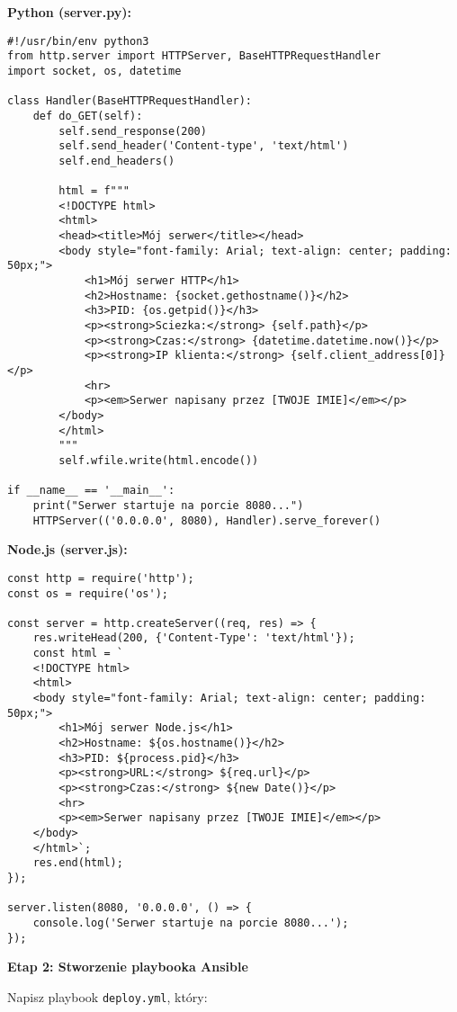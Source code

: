 \documentclass{article}
\begin{document}
\textbf{Python (server.py):}
\begin{lstlisting}
#!/usr/bin/env python3
from http.server import HTTPServer, BaseHTTPRequestHandler
import socket, os, datetime

class Handler(BaseHTTPRequestHandler):
    def do_GET(self):
        self.send_response(200)
        self.send_header('Content-type', 'text/html')
        self.end_headers()
        
        html = f"""
        <!DOCTYPE html>
        <html>
        <head><title>Mój serwer</title></head>
        <body style="font-family: Arial; text-align: center; padding: 50px;">
            <h1>Mój serwer HTTP</h1>
            <h2>Hostname: {socket.gethostname()}</h2>
            <h3>PID: {os.getpid()}</h3>
            <p><strong>Sciezka:</strong> {self.path}</p>
            <p><strong>Czas:</strong> {datetime.datetime.now()}</p>
            <p><strong>IP klienta:</strong> {self.client_address[0]}</p>
            <hr>
            <p><em>Serwer napisany przez [TWOJE IMIE]</em></p>
        </body>
        </html>
        """
        self.wfile.write(html.encode())

if __name__ == '__main__':
    print("Serwer startuje na porcie 8080...")
    HTTPServer(('0.0.0.0', 8080), Handler).serve_forever()
\end{lstlisting}

\textbf{Node.js (server.js):}
\begin{lstlisting}
const http = require('http');
const os = require('os');

const server = http.createServer((req, res) => {
    res.writeHead(200, {'Content-Type': 'text/html'});
    const html = `
    <!DOCTYPE html>
    <html>
    <body style="font-family: Arial; text-align: center; padding: 50px;">
        <h1>Mój serwer Node.js</h1>
        <h2>Hostname: ${os.hostname()}</h2>
        <h3>PID: ${process.pid}</h3>
        <p><strong>URL:</strong> ${req.url}</p>
        <p><strong>Czas:</strong> ${new Date()}</p>
        <hr>
        <p><em>Serwer napisany przez [TWOJE IMIE]</em></p>
    </body>
    </html>`;
    res.end(html);
});

server.listen(8080, '0.0.0.0', () => {
    console.log('Serwer startuje na porcie 8080...');
});
\end{lstlisting}

\textbf{Etap 2: Stworzenie playbooka Ansible}

Napisz playbook \texttt{deploy.yml}, który:
\end{document}
